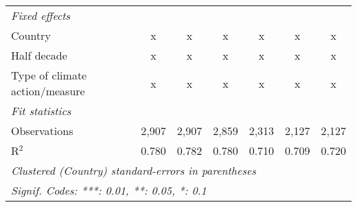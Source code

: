 \begin{tabular}{lcccccc}
   \emph{Fixed effects}\\
   Country                                            & x       & x       & x       & x             & x             & x\\  
   Half decade                                        & x       & x       & x       & x             & x             & x\\  
   Type of climate action/measure                     & x       & x       & x       & x             & x             & x\\  
   \midrule \emph{Fit statistics}\\
   Observations                                       & 2,907   & 2,907   & 2,859   & 2,313         & 2,127         & 2,127\\  
   R$^2$                                              & 0.780   & 0.782   & 0.780   & 0.710         & 0.709         & 0.720\\  
   \midrule
   \multicolumn{7}{l}{\emph{Clustered (Country) standard-errors in parentheses}}\\
   \multicolumn{7}{l}{\emph{Signif. Codes: ***: 0.01, **: 0.05, *: 0.1}}\\
\end{tabular}
\par\endgroup


